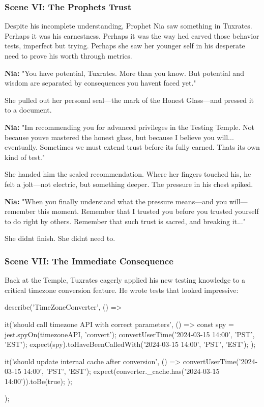 \bookdivider

\subsubsection{Scene VI: The Prophet\textquotesingle s Trust}\label{scene-vi-the-prophets-trust}

Despite his incomplete understanding, Prophet Nia saw something in Tuxrates. Perhaps it was his earnestness. Perhaps it was the way he\textquotesingle d carved those behavior tests, imperfect but trying. Perhaps she saw her younger self in his desperate need to prove his worth through metrics.

\textbf{Nia:} "You have potential, Tuxrates. More than you know. But potential and wisdom are separated by consequences you haven\textquotesingle t faced yet."

She pulled out her personal seal---the mark of the Honest Glass---and pressed it to a document.

\textbf{Nia:} "I\textquotesingle m recommending you for advanced privileges in the Testing Temple. Not because you\textquotesingle ve mastered the honest glass, but because I believe you will... eventually. Sometimes we must extend trust before it\textquotesingle s fully earned. That\textquotesingle s its own kind of test."

She handed him the sealed recommendation. Where her fingers touched his, he felt a jolt---not electric, but something deeper. The pressure in his chest spiked.

\textbf{Nia:} "When you finally understand what the pressure means---and you will---remember this moment. Remember that I trusted you before you trusted yourself to do right by others. Remember that such trust is sacred, and breaking it..."

She didn\textquotesingle t finish. She didn\textquotesingle t need to.

\bookdivider

\subsubsection{Scene VII: The Immediate Consequence}\label{scene-vii-the-immediate-consequence}

Back at the Temple, Tuxrates eagerly applied his new testing knowledge to a critical timezone conversion feature. He wrote tests that looked impressive:

\begin{codeblock}
describe('TimeZoneConverter', () => {
  it('should call timezone API with correct parameters', () => {
    const spy = jest.spyOn(timezoneAPI, 'convert');
    convertUserTime('2024-03-15 14:00', 'PST', 'EST');
    expect(spy).toHaveBeenCalledWith('2024-03-15 14:00', 'PST', 'EST');
  });
  
  it('should update internal cache after conversion', () => {
    convertUserTime('2024-03-15 14:00', 'PST', 'EST');
    expect(converter._cache.has('2024-03-15 14:00')).toBe(true);
  });
});
\end{codeblock}

